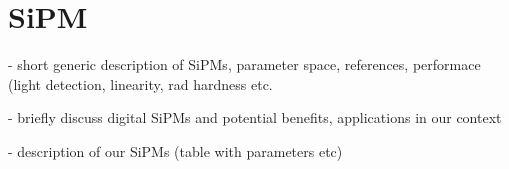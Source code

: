 \section{SiPM}

- short generic description of SiPMs, parameter space, references, performace (light detection, linearity, rad hardness etc.

- briefly discuss digital SiPMs and potential benefits, applications in our context

- description of our SiPMs (table with parameters etc)
